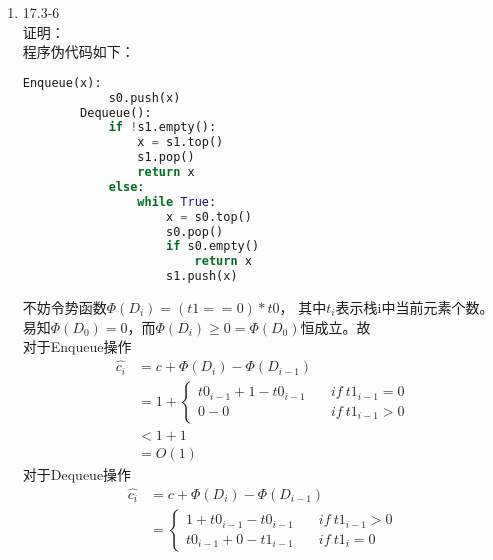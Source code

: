 \documentclass[UTF8]{ctexart}
\begin{document}
\begin{enumerate}
	\item 17.3-6 \\
	证明：\\
	程序伪代码如下：
	\begin{lstlisting}[language=Python]
		Enqueue(x):
			s0.push(x)
		Dequeue():
			if !s1.empty():
				x = s1.top()
				s1.pop()
				return x
			else:
				while True:
					x = s0.top()
					s0.pop()
					if s0.empty()
						return x
					s1.push(x)	
	\end{lstlisting}
	不妨令势函数$\Phi(D_i) = (t1==0)*t0$，
	其中$t_i$表示栈i中当前元素个数。
	易知$\Phi(D_0) = 0$，而$\Phi(D_i) \ge 0 = \Phi(D_0)$恒成立。故\\
	对于Enqueue操作
	\begin{align*}
		\hat{c_i}	&= c + \Phi(D_i) - \Phi(D_{i-1})	\\
					&= 1 +	\left\{
								\begin{aligned}
									t0_{i-1}+1 - t0_{i-1}	&\quad if \ t1_{i-1}=0	\\
									0 - 0	&\quad if \ t1_{i-1}>0
								\end{aligned}
							\right.	\\
					&< 1 + 1	\\
					&= O(1)
	\end{align*}
	对于Dequeue操作
	\begin{align*}
		\hat{c_i}	&= c + \Phi(D_i) - \Phi(D_{i-1})	\\
					&=	\left\{
							\begin{aligned}
								1 + t0_{i-1} - t0_{i-1}	&\quad if \ t1_{i-1}>0	\\
								t0_{i-1} + 0 - t1_{i-1} &\quad if \ t1_i=0
							\end{aligned}
						\right.	\\
					&
	\end{align*}
	
\end{enumerate}
\end{document}
